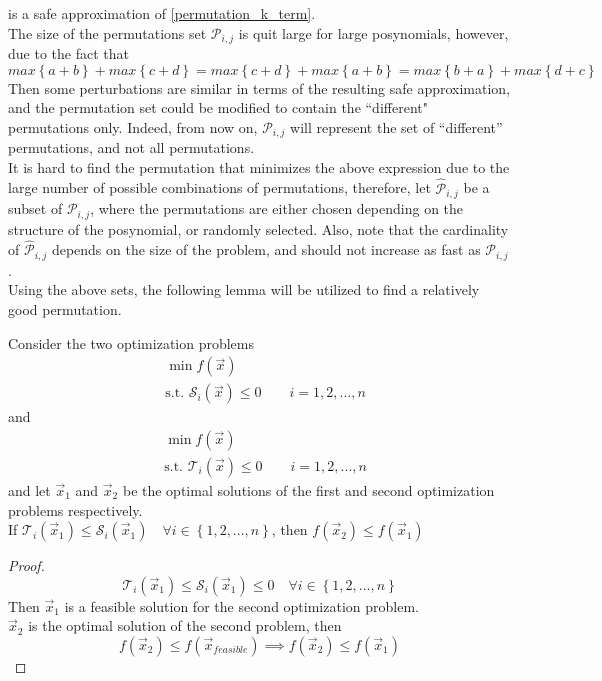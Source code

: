 is a safe approximation of \eqref{permutation_k_term}.\\[12pt]
The size of the permutations set $\mathcal{P}_{i,j}$ is quit large for large posynomials, however, due to the fact that
$$
max \left\{a + b\right\} + max \left\{c + d\right\} = max \left\{c + d\right\} + max \left\{a + b\right\} = max \left\{b + a\right\} + max \left\{d + c\right\}
$$
Then some perturbations are similar in terms of the resulting safe approximation, and the permutation set could be modified to contain the ``different" permutations only. Indeed, from now on, $\mathcal{P}_{i,j}$ will represent the set of ``different'' permutations, and not all permutations.\\[12pt]
It is hard to find the permutation that minimizes the above expression due to the large number of possible combinations of permutations, therefore, let $\hat{\mathcal{P}}_{i,j}$ be a subset of $\mathcal{P}_{i,j}$, where the permutations are either chosen depending on the structure of the posynomial, or randomly selected. Also, note that the cardinality of $\hat{\mathcal{P}}_{i,j}$ depends on the size of the problem, and should not increase as fast as $\mathcal{P}_{i,j}$.\\
Using the above sets, the following lemma will be utilized to find a relatively good permutation.

\begin{lemma}
Consider the two optimization problems
$$
\begin{aligned}
&\min f(\vec{x})\\
&\text{s.t. } \mathcal{S}_i(\vec{x}) \leq 0 \qquad i = 1,2,...,n
\end{aligned}
$$
and
$$
\begin{aligned}
&\min f(\vec{x})\\
&\text{s.t. } \mathcal{T}_i(\vec{x}) \leq 0 \qquad i = 1,2,...,n
\end{aligned}
$$
and let $\vec{x}_1$ and $\vec{x}_2$ be the optimal solutions of the first and second optimization problems respectively.\\
If $\mathcal{T}_i(\vec{x}_1) \leq \mathcal{S}_i(\vec{x}_1) \quad \forall i \in \left\{1,2,...,n\right\}$, then $f(\vec{x}_2) \leq f(\vec{x}_1)$
\end{lemma}
\begin{proof}
$$\mathcal{T}_i(\vec{x}_1) \leq \mathcal{S}_i(\vec{x}_1) \leq 0 \quad \forall i \in \left\{1,2,...,n\right\} $$
Then $\vec{x}_1$ is a feasible solution for the second optimization problem.\\
$\vec{x}_2$ is the optimal solution of the second problem, then $$f(\vec{x}_2) \leq f(\vec{x}_{feasible}) \implies f(\vec{x}_2) \leq f(\vec{x}_1)$$
\end{proof}

